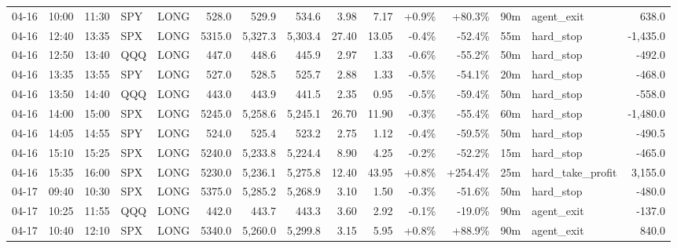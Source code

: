 \documentclass[11pt,a4paper,twoside]{article}
\begin{document}
\begin{landscape}
\begin{center}
\begin{longtable}{>{\color{txtmain}}l l l l l r r r r r r r r >{\color{txtmain}}l r}
04-16 & 10:00 & 11:30 & SPY & LONG & 528.0 & 529.9 & 534.6 & 3.98 & 7.17 & \textcolor{wingreen}{+0.9\%} & \textcolor{wingreen}{+80.3\%} & 90m & agent\_exit & \textcolor{wingreen}{638.0} \\
04-16 & 12:40 & 13:35 & SPX & LONG & 5315.0 & 5,327.3 & 5,303.4 & 27.40 & 13.05 & \textcolor{lossred}{-0.4\%} & \textcolor{lossred}{-52.4\%} & 55m & hard\_stop & \textcolor{lossred}{-1,435.0} \\
04-16 & 12:50 & 13:40 & QQQ & LONG & 447.0 & 448.6 & 445.9 & 2.97 & 1.33 & \textcolor{lossred}{-0.6\%} & \textcolor{lossred}{-55.2\%} & 50m & hard\_stop & \textcolor{lossred}{-492.0} \\
04-16 & 13:35 & 13:55 & SPY & LONG & 527.0 & 528.5 & 525.7 & 2.88 & 1.33 & \textcolor{lossred}{-0.5\%} & \textcolor{lossred}{-54.1\%} & 20m & hard\_stop & \textcolor{lossred}{-468.0} \\
04-16 & 13:50 & 14:40 & QQQ & LONG & 443.0 & 443.9 & 441.5 & 2.35 & 0.95 & \textcolor{lossred}{-0.5\%} & \textcolor{lossred}{-59.4\%} & 50m & hard\_stop & \textcolor{lossred}{-558.0} \\
04-16 & 14:00 & 15:00 & SPX & LONG & 5245.0 & 5,258.6 & 5,245.1 & 26.70 & 11.90 & \textcolor{lossred}{-0.3\%} & \textcolor{lossred}{-55.4\%} & 60m & hard\_stop & \textcolor{lossred}{-1,480.0} \\
04-16 & 14:05 & 14:55 & SPY & LONG & 524.0 & 525.4 & 523.2 & 2.75 & 1.12 & \textcolor{lossred}{-0.4\%} & \textcolor{lossred}{-59.5\%} & 50m & hard\_stop & \textcolor{lossred}{-490.5} \\
04-16 & 15:10 & 15:25 & SPX & LONG & 5240.0 & 5,233.8 & 5,224.4 & 8.90 & 4.25 & \textcolor{lossred}{-0.2\%} & \textcolor{lossred}{-52.2\%} & 15m & hard\_stop & \textcolor{lossred}{-465.0} \\
04-16 & 15:35 & 16:00 & SPX & LONG & 5230.0 & 5,236.1 & 5,275.8 & 12.40 & 43.95 & \textcolor{wingreen}{+0.8\%} & \textcolor{wingreen}{+254.4\%} & 25m & hard\_take\_profit & \textcolor{wingreen}{3,155.0} \\
04-17 & 09:40 & 10:30 & SPX & LONG & 5375.0 & 5,285.2 & 5,268.9 & 3.10 & 1.50 & \textcolor{lossred}{-0.3\%} & \textcolor{lossred}{-51.6\%} & 50m & hard\_stop & \textcolor{lossred}{-480.0} \\
04-17 & 10:25 & 11:55 & QQQ & LONG & 442.0 & 443.7 & 443.3 & 3.60 & 2.92 & \textcolor{lossred}{-0.1\%} & \textcolor{lossred}{-19.0\%} & 90m & agent\_exit & \textcolor{lossred}{-137.0} \\
04-17 & 10:40 & 12:10 & SPX & LONG & 5340.0 & 5,260.0 & 5,299.8 & 3.15 & 5.95 & \textcolor{wingreen}{+0.8\%} & \textcolor{wingreen}{+88.9\%} & 90m & agent\_exit & \textcolor{wingreen}{840.0} \\

\end{longtable}
\end{center}
\end{landscape}
\end{document}

